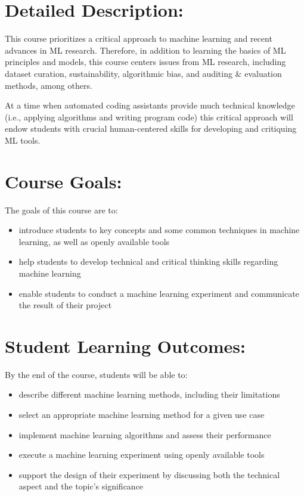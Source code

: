 \documentclass[12pt]{article}
\begin{document}
\section*{Detailed Description:}
\label{sec:org3c1ef32}
This course prioritizes a critical approach to machine learning and
recent advances in ML research. Therefore, in addition to learning the
basics of ML principles and models, this course centers issues from ML
research, including dataset curation, sustainability, algorithmic
bias, and auditing \& evaluation methods, among others.

At a time when automated coding assistants provide much technical
knowledge (i.e., applying algorithms and writing program code) this
critical approach will endow students with crucial human-centered
skills for developing and critiquing ML tools. 

\section*{Course Goals:}
\label{sec:org44e0741}
The goals of this course are to:
\begin{itemize}
\item introduce students to key concepts and some common techniques in
machine learning, as well as openly available tools
\item help students to develop technical and critical thinking skills
regarding machine learning
\item enable students to conduct a machine learning experiment and
communicate the result of their project
\end{itemize}

\section*{Student Learning Outcomes:}
\label{sec:org0a29486}
By the end of the course, students will be able to:
\begin{itemize}
\item describe different machine learning methods, including their
limitations
\item select an appropriate machine learning method for a given use case
\item implement machine learning algorithms and assess their performance
\item execute a machine learning experiment using openly available tools
\item support the design of their experiment by discussing both the
technical aspect and the topic’s significance
\end{itemize}
\end{document}
